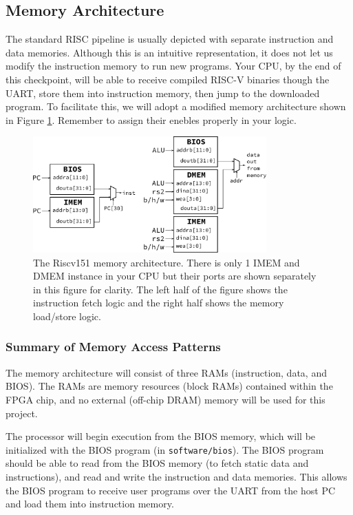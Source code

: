 \subsection{Memory Architecture}
The standard RISC pipeline is usually depicted with separate instruction and data memories.
Although this is an intuitive representation, it does not let us modify the instruction memory to run new programs.
Your CPU, by the end of this checkpoint, will be able to receive compiled RISC-V binaries though the UART, store them into instruction memory, then jump to the downloaded program.
To facilitate this, we will adopt a modified memory architecture shown in Figure \ref{fig:mem_arch}.
Remember to assign their enebles properly in your logic.

\begin{figure}[hbt]
  \begin{center}
    \includegraphics[width=0.8\textwidth]{figs/memory_arch.pdf}
    \caption{The Riscv151 memory architecture. There is only 1 IMEM and DMEM instance in your CPU but their ports are shown separately in this figure for clarity. The left half of the figure shows the instruction fetch logic and the right half shows the memory load/store logic.}
    \label{fig:mem_arch}
  \end{center}
\end{figure}

\subsubsection{Summary of Memory Access Patterns}
The memory architecture will consist of three RAMs (instruction, data, and BIOS).
The RAMs are memory resources (block RAMs) contained within the FPGA chip, and no external (off-chip DRAM) memory will be used for this project.

The processor will begin execution from the BIOS memory, which will be initialized with the BIOS program (in \verb|software/bios|).
The BIOS program should be able to read from the BIOS memory (to fetch static data and instructions), and read and write the instruction and data memories.
This allows the BIOS program to receive user programs over the UART from the host PC and load them into instruction memory.

